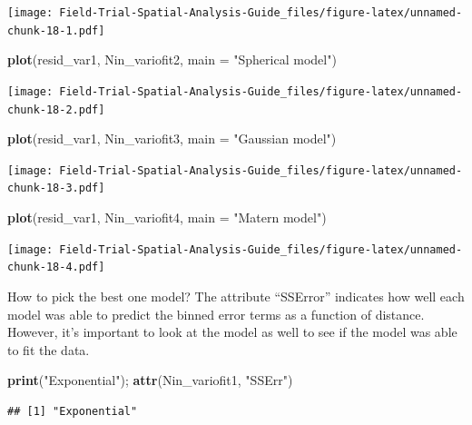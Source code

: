 \documentclass[
]{book}
\newenvironment{Shaded}{\begin{snugshade}}{\end{snugshade}}
\newcommand{\AttributeTok}[1]{\textcolor[rgb]{0.13,0.29,0.53}{#1}}
\newcommand{\FunctionTok}[1]{\textcolor[rgb]{0.13,0.29,0.53}{\textbf{#1}}}
\newcommand{\NormalTok}[1]{#1}
\newcommand{\StringTok}[1]{\textcolor[rgb]{0.31,0.60,0.02}{#1}}
\begin{document}
\texttt{[image: Field-Trial-Spatial-Analysis-Guide\_files/figure-latex/unnamed-chunk-18-1.pdf]}

\begin{Shaded}
\begin{Highlighting}[]
\FunctionTok{plot}\NormalTok{(resid\_var1, Nin\_variofit2, }\AttributeTok{main =} \StringTok{"Spherical model"}\NormalTok{)}
\end{Highlighting}
\end{Shaded}

\texttt{[image: Field-Trial-Spatial-Analysis-Guide\_files/figure-latex/unnamed-chunk-18-2.pdf]}

\begin{Shaded}
\begin{Highlighting}[]
\FunctionTok{plot}\NormalTok{(resid\_var1, Nin\_variofit3, }\AttributeTok{main =} \StringTok{"Gaussian model"}\NormalTok{)}
\end{Highlighting}
\end{Shaded}

\texttt{[image: Field-Trial-Spatial-Analysis-Guide\_files/figure-latex/unnamed-chunk-18-3.pdf]}

\begin{Shaded}
\begin{Highlighting}[]
\FunctionTok{plot}\NormalTok{(resid\_var1, Nin\_variofit4, }\AttributeTok{main =} \StringTok{"Matern model"}\NormalTok{)}
\end{Highlighting}
\end{Shaded}

\texttt{[image: Field-Trial-Spatial-Analysis-Guide\_files/figure-latex/unnamed-chunk-18-4.pdf]}

How to pick the best one model? The attribute ``SSError'' indicates how well each model was able to predict the binned error terms as a function of distance. However, it's important to look at the model as well to see if the model was able to fit the data.

\begin{Shaded}
\begin{Highlighting}[]
\FunctionTok{print}\NormalTok{(}\StringTok{"Exponential"}\NormalTok{); }\FunctionTok{attr}\NormalTok{(Nin\_variofit1, }\StringTok{"SSErr"}\NormalTok{)}
\end{Highlighting}
\end{Shaded}

\begin{verbatim}
## [1] "Exponential"
\end{verbatim}
\end{document}
